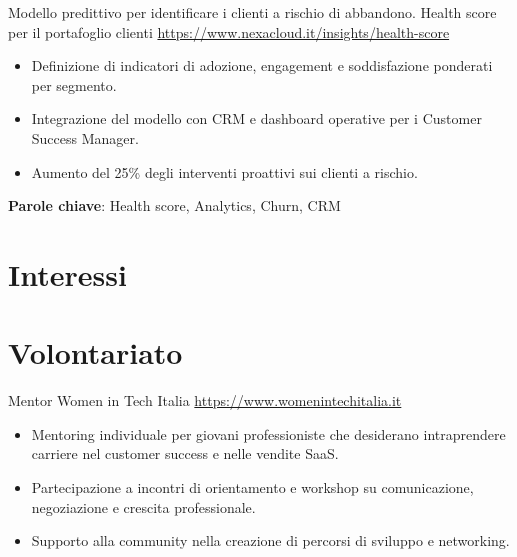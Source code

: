 \documentclass[a4paper, serif, 10pt]{moderncv}
\begin{document}
        {Modello predittivo per identificare i clienti a rischio di abbandono.}
        {Health score per il portafoglio clienti}
        {\url{https://www.nexacloud.it/insights/health-score}}
        {}
        {\begin{itemize}
\item Definizione di indicatori di adozione, engagement e soddisfazione ponderati per segmento.
\item Integrazione del modello con CRM e dashboard operative per i Customer Success Manager.
\item Aumento del 25\% degli interventi proattivi sui clienti a rischio.
\end{itemize}
\textbf{Parole chiave}: Health score, Analytics, Churn, CRM}
\section{Interessi}

\section{Volontariato}

        {Mentor}
        {Women in Tech Italia}
        {\url{https://www.womenintechitalia.it}}
        {}
        {\begin{itemize}
\item Mentoring individuale per giovani professioniste che desiderano intraprendere carriere nel customer success e nelle vendite SaaS.
\item Partecipazione a incontri di orientamento e workshop su comunicazione, negoziazione e crescita professionale.
\item Supporto alla community nella creazione di percorsi di sviluppo e networking.
\end{itemize}}
    
\end{document}

